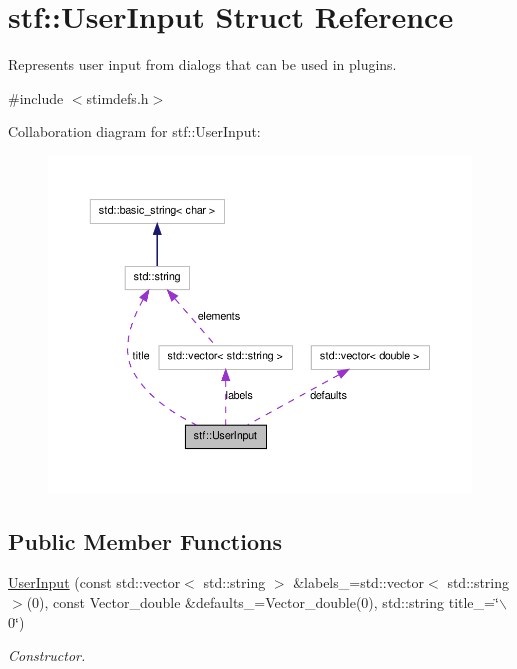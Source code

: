 \hypertarget{structstf_1_1UserInput}{
\section{stf::UserInput Struct Reference}
\label{structstf_1_1UserInput}
}


Represents user input from dialogs that can be used in plugins.  




{\ttfamily \#include $<$stimdefs.h$>$}



Collaboration diagram for stf::UserInput:
\nopagebreak
\begin{figure}[H]
\begin{center}
\leavevmode
\includegraphics[width=396pt]{structstf_1_1UserInput__coll__graph}
\end{center}
\end{figure}
\subsection*{Public Member Functions}
\begin{DoxyCompactItemize}
\item 
\hyperlink{structstf_1_1UserInput_a879bc7b16a632a1079679fb0c42bb46e}{UserInput} (const std::vector$<$ std::string $>$ \&labels\_\-=std::vector$<$ std::string $>$(0), const Vector\_\-double \&defaults\_\-=Vector\_\-double(0), std::string title\_\-=\char`\"{}$\backslash$0\char`\"{})
\begin{DoxyCompactList}\small\item\em Constructor. \item\end{DoxyCompactList}\end{DoxyCompactItemize}
